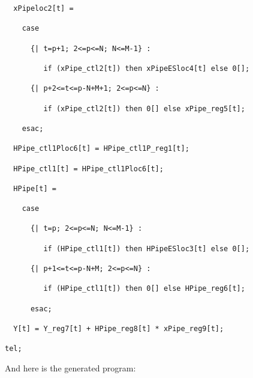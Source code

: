 \begin{verbatim}
  xPipeloc2[t] = 

    case

      {| t=p+1; 2<=p<=N; N<=M-1} : 

         if (xPipe_ctl2[t]) then xPipeESloc4[t] else 0[];

      {| p+2<=t<=p-N+M+1; 2<=p<=N} : 

         if (xPipe_ctl2[t]) then 0[] else xPipe_reg5[t];

    esac;

  HPipe_ctl1Ploc6[t] = HPipe_ctl1P_reg1[t];

  HPipe_ctl1[t] = HPipe_ctl1Ploc6[t];

  HPipe[t] = 

    case

      {| t=p; 2<=p<=N; N<=M-1} : 

         if (HPipe_ctl1[t]) then HPipeESloc3[t] else 0[];

      {| p+1<=t<=p-N+M; 2<=p<=N} : 

         if (HPipe_ctl1[t]) then 0[] else HPipe_reg6[t];

      esac;

  Y[t] = Y_reg7[t] + HPipe_reg8[t] * xPipe_reg9[t];

tel;

\end{verbatim}

And here is the generated \vhdl{} program:

